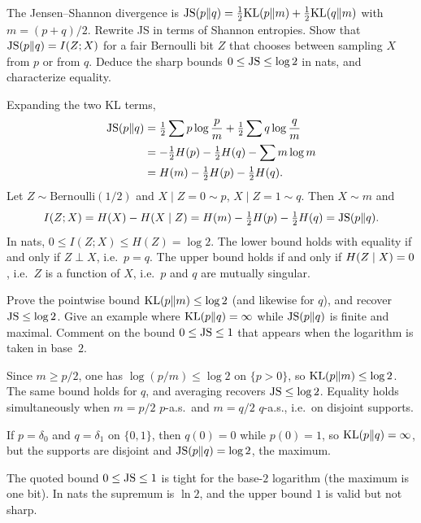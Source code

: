 \begin{hwqbox}
The Jensen--Shannon divergence is $\mathrm{JS}(p\Vert q)=\tfrac12\mathrm{KL}(p\Vert m)+\tfrac12\mathrm{KL}(q\Vert m)$ with $m=(p+q)/2$. Rewrite JS in terms of Shannon entropies. Show that $\mathrm{JS}(p\Vert q)=I(Z;X)$ for a fair Bernoulli bit $Z$ that chooses between sampling $X$ from $p$ or from $q$. Deduce the sharp bounds $0\le\mathrm{JS}\le\log 2$ in nats, and characterize equality.
\end{hwqbox}
\begin{hwsolbox}
Expanding the two KL terms,
\begin{align*}
\mathrm{JS}(p\Vert q)
&=\tfrac12\sum p\log\frac pm+\tfrac12\sum q\log\frac qm\\
&=-\tfrac12 H(p)-\tfrac12 H(q)-\sum m\log m\\
&=H(m)-\tfrac12 H(p)-\tfrac12 H(q).
\end{align*}
Let $Z\sim\mathrm{Bernoulli}(1/2)$ and $X\mid Z=0\sim p$, $X\mid Z=1\sim q$. Then $X\sim m$ and
\[
I(Z;X)=H(X)-H(X\mid Z)=H(m)-\tfrac12 H(p)-\tfrac12 H(q)=\mathrm{JS}(p\Vert q).
\]
In nats, $0\le I(Z;X)\le H(Z)=\log 2$. The lower bound holds with equality if and only if $Z\perp X$, i.e.\ $p=q$. The upper bound holds if and only if $H(Z\mid X)=0$, i.e.\ $Z$ is a function of $X$, i.e.\ $p$ and $q$ are mutually singular.
\end{hwsolbox}

\begin{hwqbox}
Prove the pointwise bound $\mathrm{KL}(p\Vert m)\le\log 2$ (and likewise for $q$), and recover $\mathrm{JS}\le\log 2$. Give an example where $\mathrm{KL}(p\Vert q)=\infty$ while $\mathrm{JS}(p\Vert q)$ is finite and maximal. Comment on the bound $0\le\mathrm{JS}\le 1$ that appears when the logarithm is taken in base~$2$.
\end{hwqbox}
\begin{hwsolbox}
Since $m\ge p/2$, one has $\log(p/m)\le\log 2$ on $\{p>0\}$, so $\mathrm{KL}(p\Vert m)\le\log 2$. The same bound holds for $q$, and averaging recovers $\mathrm{JS}\le\log 2$. Equality holds simultaneously when $m=p/2$ $p$-a.s.\ and $m=q/2$ $q$-a.s., i.e.\ on disjoint supports.

If $p=\delta_0$ and $q=\delta_1$ on $\{0,1\}$, then $q(0)=0$ while $p(0)=1$, so $\mathrm{KL}(p\Vert q)=\infty$, but the supports are disjoint and $\mathrm{JS}(p\Vert q)=\log 2$, the maximum.

The quoted bound $0\le\mathrm{JS}\le 1$ is tight for the base-$2$ logarithm (the maximum is one bit). In nats the supremum is $\ln 2$, and the upper bound $1$ is valid but not sharp.
\end{hwsolbox}

